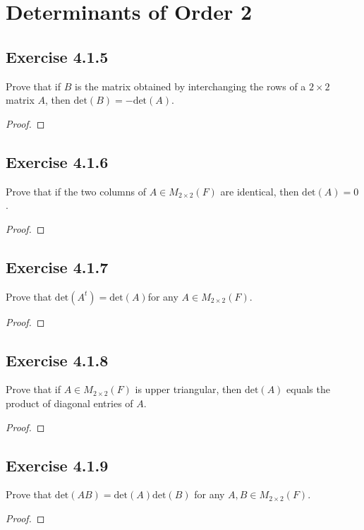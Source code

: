 \section{Determinants of Order 2}

\subsection*{Exercise 4.1.5} Prove that if \( B   \) is the matrix obtained by interchanging the rows of a \( 2 \times 2  \) matrix \( A  \), then \( \text{det}(B) = - \text{det}(A) \).
\begin{proof}

\end{proof}

\subsection*{Exercise 4.1.6} Prove that if the two columns of \( A \in {M}_{2 \times 2}(F)  \) are identical, then \( \text{det}(A) = 0  \).
\begin{proof}

\end{proof}

\subsection*{Exercise 4.1.7} Prove that \( \text{det}(A^{t}) = \text{det}(A) \)for any \( A \in {M}_{2 \times 2}(F)  \).
\begin{proof}

\end{proof}

\subsection*{Exercise 4.1.8} Prove that if \( A \in {M}_{2 \times 2}(F) \) is upper triangular, then \( \text{det}(A) \) equals the product of diagonal entries of \( A  \).
\begin{proof}

\end{proof}

\subsection*{Exercise 4.1.9} Prove that \( \text{det}(AB) = \text{det}(A) \text{det}(B) \) for any \( A,B \in {M}_{2 \times 2}(F) \).
\begin{proof}

\end{proof}

